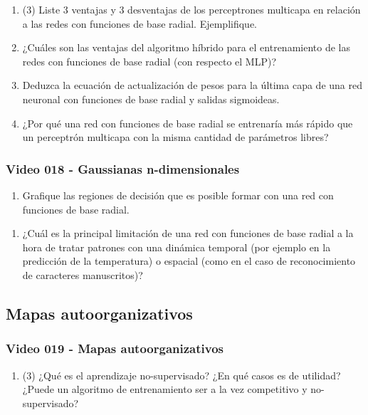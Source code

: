 \documentclass[a4paper,10pt,spanish,oneside]{article}
\begin{document}
\begin{enumerate}
\item (3) Liste 3 ventajas y 3 desventajas de los perceptrones multicapa en relación a las redes con funciones de base radial. Ejemplifique.

\item ¿Cuáles son las ventajas del algoritmo híbrido para el entrenamiento de las redes con funciones de base radial (con respecto el MLP)?

\item Deduzca la ecuación de actualización de pesos para la última capa de una red neuronal con funciones de base radial y salidas sigmoideas.

\item ¿Por qué una red con funciones de base radial se entrenaría más rápido que un perceptrón multicapa con la misma cantidad de parámetros libres?
\end{enumerate}

\subsubsection{Video 018 - Gaussianas n-dimensionales}

\begin{enumerate}
\item Grafique las regiones de decisión que es posible formar con una red con funciones de base radial.
\end{enumerate}

\begin{enumerate}
\item ¿Cuál es la principal limitación de una red con funciones de base radial a la hora de tratar patrones con una dinámica temporal (por ejemplo en la predicción de la temperatura) o espacial (como en el caso de reconocimiento de caracteres manuscritos)?
\end{enumerate}

\newpage

\subsection{Mapas autoorganizativos}

\subsubsection{Video 019 - Mapas autoorganizativos}

\begin{enumerate}
\item (3) ¿Qué es el aprendizaje no-supervisado? ¿En qué casos es de utilidad? ¿Puede un algoritmo de entrenamiento ser a la vez competitivo y no-supervisado?
\end{enumerate}
\end{document}
